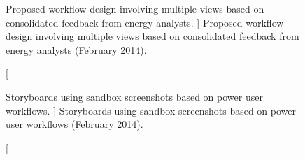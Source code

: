 

\begin{figure}
	\centering
	\caption
	[
	    Proposed workflow design involving multiple views based on consolidated feedback from energy analysts.
	]
	{
    	Proposed workflow design involving multiple views based on consolidated feedback from energy analysts (February 2014). 
	}
	\centering
	\label{app:emu:fig:workflow}
\end{figure}



\begin{figure}
	\centering
	\caption
	[
	    Storyboards using sandbox screenshots based on power user workflows.
	]
	{
    	Storyboards using sandbox screenshots based on power user workflows (February 2014). 
	}
	\centering
	\label{app:emu:fig:storyboards}
\end{figure}


